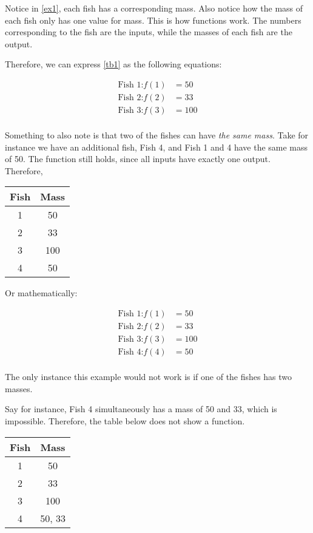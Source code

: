 Notice in \cref{ex1}, each fish has a corresponding mass. Also notice how the mass of each fish only has one value for mass. This is how functions work. The numbers corresponding to the fish are the inputs, while the masses of each fish are the output.

Therefore, we can express \cref{tb1} as the following equations:

\begin{align*}
    \text{Fish 1:} f(1) &= 50 \\
    \text{Fish 2:} f(2) &= 33 \\
    \text{Fish 3:} f(3) &= 100 \\    
\end{align*}

Something to also note is that two of the fishes can have \emph{the same mass}. Take for instance we have an additional fish, Fish 4, and Fish 1 and 4 have the same mass of 50. The function still holds, since all inputs have exactly one output. Therefore,

\begin{center}
    \begin{tabular}{cc}
        \toprule
        Fish & Mass \\
        \midrule
        1 & 50 \\
        2 & 33 \\
        3 & 100 \\
        4 & 50 \\
        \bottomrule
    \end{tabular}
\end{center}

Or mathematically:

\begin{align*}
    \text{Fish 1:} f(1) &= 50 \\
    \text{Fish 2:} f(2) &= 33 \\
    \text{Fish 3:} f(3) &= 100 \\    
    \text{Fish 4:} f(4) &= 50 \\    
\end{align*}

The only instance this example would not work is if one of the fishes has two masses.

Say for instance, Fish 4 simultaneously has a mass of 50 and 33, which is impossible. Therefore, the table below does not show a function.

\begin{center}
    \begin{tabular}{cc}
        \toprule
        Fish & Mass \\
        \midrule
        1 & 50 \\
        2 & 33 \\
        3 & 100 \\
        4 & 50, 33 \\
        \bottomrule
    \end{tabular}
\end{center}

